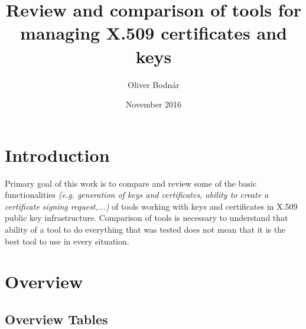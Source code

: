 \documentclass[10pt, a4paper]{report}
\title{Review and comparison of tools for managing X.509 certificates and keys}
\author{Oliver Bodnár}
\date{November 2016}
\begin{document}
\maketitle

\tableofcontents

\newpage

\part{Introduction}

Primary goal of this work is to compare and review some of the basic functionalities \textit{(e.g. generation of keys and certificates, ability to create a certificate signing request,...)} of tools working with keys and certificates in X.509 public key infrastructure. Comparison of tools is necessary to understand that ability of a tool to do everything that was tested does not mean that it is the best tool to use in every situation.
\part{Overview}

\chapter{Overview Tables}
\end{document}
